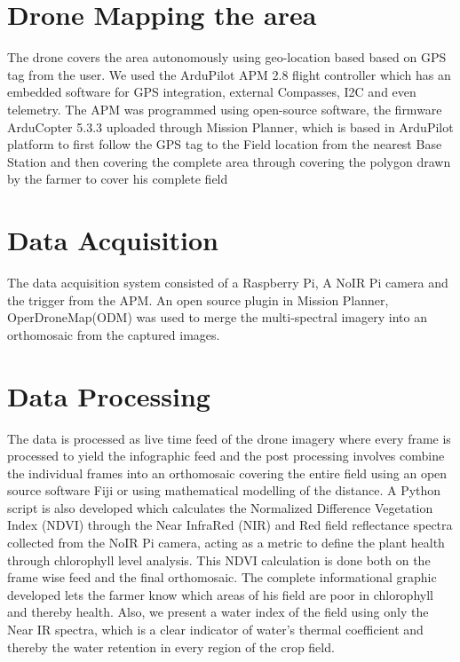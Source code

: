 \section{Drone Mapping the area} The drone covers the area autonomously using geo-location based based on GPS tag from the user. We used the ArduPilot APM 2.8 flight controller which has an embedded software for GPS integration, external Compasses, I2C and even telemetry. The APM was programmed using open-source software, the firmware ArduCopter 5.3.3 uploaded through Mission Planner, which is based in ArduPilot platform to first follow the GPS tag to the Field location from the nearest Base Station and then covering the complete area through covering the polygon drawn by the farmer to cover his complete field

\section{Data Acquisition} The data acquisition system consisted of a Raspberry Pi, A NoIR Pi camera and the trigger from the APM. An open source plugin in Mission Planner, OperDroneMap(ODM) was used to merge the multi-spectral imagery into an orthomosaic from the captured images. 

\section{Data Processing} The data is processed as live time feed of the drone imagery where every frame is processed to yield the infographic feed and the post processing involves combine the individual frames into an orthomosaic covering the entire field using an open source software Fiji or using mathematical modelling of the distance. A Python script is also developed which calculates the Normalized Difference Vegetation Index (NDVI) through the Near InfraRed (NIR) and Red field reflectance spectra collected from the NoIR Pi camera, acting as a metric to define the plant health through chlorophyll level analysis. This NDVI calculation is done both on the frame wise feed and the final orthomosaic. The complete informational graphic developed lets the farmer know which areas of his field are poor in chlorophyll and thereby health. Also, we present a water index of the field using only the Near IR spectra, which is a clear indicator of water's thermal coefficient and thereby the water retention in every region of the crop field. 



